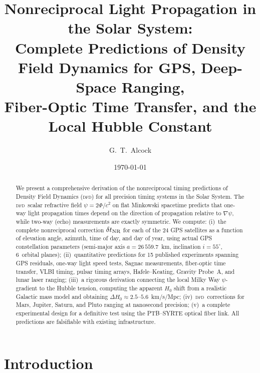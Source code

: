 \documentclass[aps,prl,twocolumn,superscriptaddress,showpacs]{revtex4-2}
\newcommand{\DFD}{\textsc{dfd}}
\begin{document}
\title{Nonreciprocal Light Propagation in the Solar System:\\
Complete Predictions of Density Field Dynamics for GPS, Deep-Space Ranging,\\
Fiber-Optic Time Transfer, and the Local Hubble Constant}

\author{G.~T.~Alcock}

\date{\today}

\begin{abstract}
We present a comprehensive derivation of the nonreciprocal timing
predictions of Density Field Dynamics (\DFD) for all precision
timing systems in the Solar System.  The \DFD\ scalar refractive
field $\psi = 2\Phi/c^2$ on flat Minkowski spacetime predicts that
one-way light propagation times depend on the direction of
propagation relative to $\nabla\psi$, while two-way (echo)
measurements are exactly symmetric.  We compute:
(i)~the complete nonreciprocal correction $\delta t_{\rm NR}$
for each of the 24 GPS satellites as a function of elevation angle,
azimuth, time of day, and day of year, using actual GPS
constellation parameters (semi-major axis $a = 26\,559.7$~km,
inclination $i = 55^\circ$, 6~orbital planes);
(ii)~quantitative predictions for 15 published experiments
spanning GPS residuals, one-way light speed tests, Sagnac
measurements, fiber-optic time transfer, VLBI timing, pulsar
timing arrays, Hafele--Keating, Gravity Probe~A, and lunar
laser ranging;
(iii)~a rigorous derivation connecting the local Milky Way
$\psi$-gradient to the Hubble tension, computing the apparent
$H_0$ shift from a realistic Galactic mass model and obtaining
$\Delta H_0 \approx 2.5$--$5.6$~km/s/Mpc;
(iv)~\DFD\ corrections for Mars, Jupiter, Saturn, and Pluto
ranging at nanosecond precision;
(v)~a complete experimental design for a definitive test using
the PTB--SYRTE optical fiber link.
All predictions are falsifiable with existing infrastructure.
\end{abstract}

\maketitle

\section{Introduction}
\end{document}
